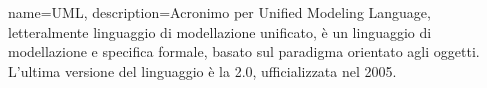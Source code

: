 {
	name=UML,
	description={Acronimo per Unified Modeling Language, letteralmente linguaggio di modellazione unificato, è un linguaggio di modellazione e specifica formale, basato sul paradigma orientato agli oggetti. L'ultima versione del linguaggio è la 2.0, ufficializzata nel 2005.}
}